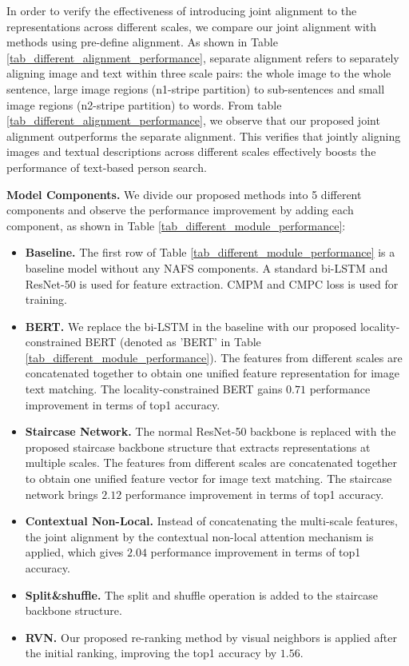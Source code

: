 \documentclass[final]{cvpr}
\begin{document}
In order to verify the effectiveness of introducing joint alignment to the representations across different scales, we compare our joint alignment with methods using pre-define alignment.
As shown in  Table \ref{tab_different_alignment_performance}, separate alignment refers to separately aligning image and text within three scale pairs: the whole image to the whole sentence, large image regions (n1-stripe partition) to sub-sentences and small image regions (n2-stripe partition) to words. 
From table \ref{tab_different_alignment_performance}, we observe that our proposed joint alignment outperforms the separate alignment. This verifies that jointly aligning images and textual descriptions across different scales effectively boosts the performance of text-based person search. 

\textbf{Model Components.} We divide our proposed methods into 5 different components and observe the performance improvement by adding each component, as shown in Table \ref{tab_different_module_performance}: 
\begin{itemize}
\item \textbf{Baseline.} The first row of Table  \ref{tab_different_module_performance} is a baseline model without any NAFS components. A standard bi-LSTM\cite{hochreiter1997long} and ResNet-50 is used for feature extraction. CMPM and CMPC loss is used for training. 
\vspace{-4pt}
\item \textbf{BERT.} We replace the bi-LSTM in the baseline with our proposed locality-constrained BERT (denoted as 'BERT' in Table \ref{tab_different_module_performance}). The features from different scales are concatenated together to obtain one unified feature representation for image text matching. The locality-constrained BERT gains $0.71$ performance improvement in terms of top1 accuracy.
\vspace{-4pt}
\item \textbf{Staircase Network.} The normal ResNet-50 backbone is replaced with the proposed staircase backbone structure that extracts representations at multiple scales. The features from different scales are concatenated together to obtain one unified feature vector for image text matching. The staircase network brings $2.12$ performance improvement in terms of top1 accuracy. 
\vspace{-4pt}
\item \textbf{Contextual Non-Local.} Instead of concatenating the multi-scale features, the joint alignment by the contextual non-local attention mechanism is applied, which gives $2.04$ performance improvement in terms of top1 accuracy.  
\vspace{-4pt}
\item \textbf{Split\&shuffle.} The split and shuffle operation is added to the staircase backbone structure. 
\vspace{-4pt}
\item \textbf{RVN.}  Our proposed re-ranking method by visual neighbors is applied after the initial ranking, improving the top1 accuracy by $1.56$. 
\end{itemize}
\end{document}
